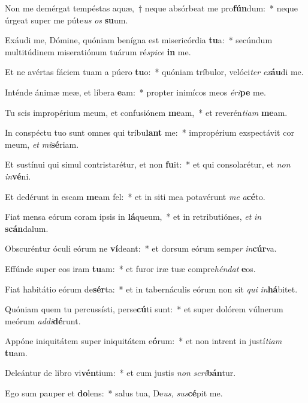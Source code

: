 \item Non me demérgat tempéstas aquæ,~† neque absórbeat me pro\textbf{fún}dum:~* neque úrgeat super me púte\tinyhspace\textit{us} \textit{os} \textbf{su}um.
\item Exáudi me, Dómine, quóniam benígna est misericórdia \textbf{tu}a:~* secúndum multitúdinem miseratiónum tuárum ré\tinyhspace\textit{spice} \textbf{in} me.
\item Et ne avértas fáciem tuam a púero \textbf{tu}o:~* quóniam tríbulor, velóci\textit{ter} \textit{ex}\textbf{áu}di me.
\item Inténde ánimæ meæ, et líbera \textbf{e}am:~* propter inimícos meos \textit{éri}\hspace*{-0.01em}\textbf{pe} me.
\item Tu scis impropérium meum, et confusiónem \textbf{me}am,~* et reverén\textit{tiam} \textbf{me}am.
\item In conspéctu tuo sunt omnes qui tríbu\textbf{lant} me:~* impropérium exspectávit cor meum, \textit{et} \textit{mi}\hspace*{-0.01em}\textbf{sé}riam.
\item Et sustínui qui simul contristarétur, et non \textbf{fu}it:~* et qui consolarétur, et \textit{non} \textit{in}\textbf{vé}ni.
\item Et dedérunt in escam \textbf{me}am fel:~* et in siti mea potavérunt \textit{me} \textit{a}\textbf{cé}to.
\item Fiat mensa eórum coram ipsis in \textbf{lá}queum,~* et in retributiónes, \textit{et} \textit{in} \textbf{scán}dalum.
\item Obscuréntur óculi eórum ne \textbf{ví}deant:~* et dorsum eórum sem\textit{per} \textit{in}\textbf{cúr}va.
\item Effúnde super eos iram \textbf{tu}am:~* et furor iræ tuæ compre\textit{héndat} \textbf{e}os.
\item Fiat habitátio eórum de\textbf{sér}ta:~* et in tabernáculis eórum non sit \textit{qui} \textit{in}\textbf{há}bitet.
\item Quóniam quem tu percussísti, perse\textbf{cú}ti sunt:~* et super dolórem vúlnerum meórum \textit{addi}\textbf{dé}runt.
\item Appóne iniquitátem super iniquitátem e\textbf{ó}rum:~* et non intrent in ju\-stí\textit{tiam} \textbf{tu}am.
\item Deleántur de libro vi\textbf{vén}tium:~* et cum ju\-stis \textit{non} \textit{scri}\textbf{bán}tur.
\item Ego sum pauper et \textbf{do}lens:~* salus tua, De\tinyhspace\textit{us,} \textit{sus}\textbf{cé}pit me.
